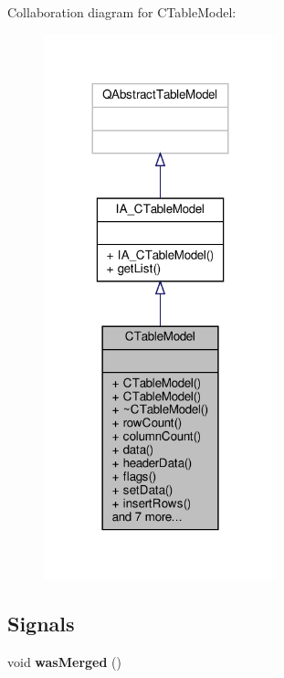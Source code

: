 Collaboration diagram for C\+Table\+Model\+:
\nopagebreak
\begin{figure}[H]
\begin{center}
\leavevmode
\includegraphics[width=191pt]{classCTableModel__coll__graph}
\end{center}
\end{figure}
\subsection*{Signals}
\begin{DoxyCompactItemize}
\item 
\mbox{\label{classCTableModel_aeef7a1f53915aaeef16892497c293baa}} 
void {\bfseries was\+Merged} ()
\end{DoxyCompactItemize}
